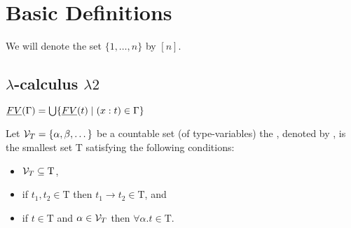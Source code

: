 \section{Basic Definitions}
We will denote the set $\{1,\dots,n\}$ by $\left[n\right]$.
\subsection{$\lambda$-calculus $\lambda2$}
$\emph{FV}(\Gamma)=\bigcup\{\emph{FV}(t)\mid (x:t)\in \Gamma\}$\\
\begin{definition}
Let $\mathcal{V}_T=\{\alpha,\beta,\dots\}$ be a countable set (of type-variables) the , denoted by \lambdaTypes{}, is the smallest set T satisfying the following conditions:
\begin{itemize}
\item $\mathcal{V}_T\subseteq\text{T}$,
\item if $t_1,t_2\in\text{T}$ then $t_1\to t_2\in\text{T}$, and
\item if $t\in\text{T}$ and $\alpha\in\mathcal{V}_T$ then $\forall\alpha.t\in\text{T}$.
\end{itemize}
\end{definition}

